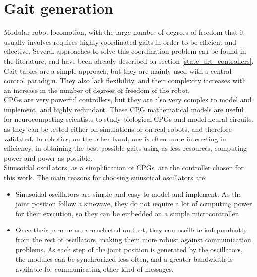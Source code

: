 \section{Gait generation}
\label{gaits}

Modular robot locomotion, with the large number of degrees of freedom that it usually involves requires highly
coordinated gaits in order to be efficient and effective. Several approaches to solve this coordination problem can be found in the literature, and have been already described on section \ref{state_art_controllers}.\\

Gait tables are a simple approach, but they are mainly used with a central control paradigm. They also lack flexibility, and their complexity increases with an increase in the number of degrees of freedom of the robot.\\

CPGs are very powerful controllers, but they are also very complex to model and implement, and highly redundant. These CPG mathematical models are useful for neurocomputing scientists to study biological CPGs and model neural circuits, as they can be tested either on simulations or on real robots, and therefore validated. In robotics, on the other hand, one is often more interesting in efficiency, in obtaining the best possible gaits using as less resources, computing power and power as possible.\\

Sinusoidal oscillators, as a simplification of CPGs, are the controller chosen for this work. The main reasons for choosing sinusoidal oscillators are:
\begin{itemize}
	\item Sinusoidal oscillators are simple and easy to model and implement. As the joint position follow a sinewave, they do not require a lot of computing power for their execution, so they can be embedded on a simple microcontroller.
	
	\item Once their paremeters are selected and set, they can oscillate independently from the rest of oscillators, making them more robust against communication problems. As each step of the joint position is generated by the oscillators, the modules can be synchronized less often, and a greater bandwidth is available for communicating other kind of messages.\\
\end{itemize}
                                                      

